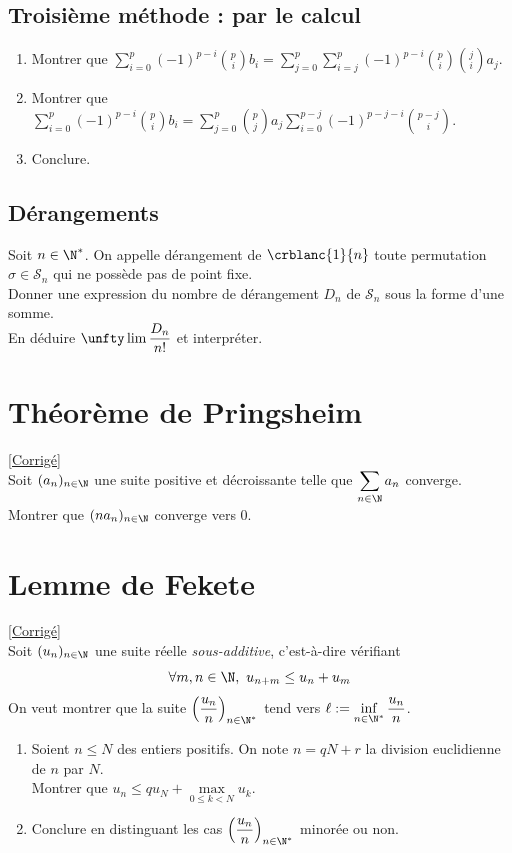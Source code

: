 \documentclass{book}
\begin{document}
	\subsection{Troisième méthode : par le calcul }
	\begin{enumerate}
		\item Montrer que $\displaystyle\sum_{i=0}^p(-1)^{p-i}\binom{p}{i}b_i=\sum_{j=0}^p\sum_{i=j}^p(-1)^{p-i}\binom{p}{i}\binom{j}{i}a_j$.
		\item Montrer que $\displaystyle\sum_{i=0}^p(-1)^{p-i}\binom{p}{i}b_i=\sum_{j=0}^p\binom{p}{j}a_j\sum_{i=0}^{p-j}(-1)^{p-j-i}\binom{p-j}{i}$.
		\item Conclure.
	\end{enumerate}
	
	\subsection{Dérangements }
	Soit $n\in \N^*$. On appelle dérangement de $\crblanc{1}{n}$ toute permutation $\sigma\in \mathcal S_n$ qui ne possède pas de point fixe.\\
	Donner une expression du nombre de dérangement $D_n$ de $\mathcal S_n$ sous la forme d'une somme.\\
	En déduire $\unfty\lim\displaystyle\frac{D_n}{n!}$ et interpréter.
	
	\section{Théorème de Pringsheim }
	\textcolor{blue}{\hyperref[sec:theoreme-de-pringsheim-etoile3]{[Corrigé]}}\\
	\label{Théorème de Pringsheim}
	Soit $(a_n)_{n\in \N}$ une suite positive et décroissante telle que $\displaystyle\sum\limits_{n\in \N} a_n$ converge. \\Montrer que $(na_n)_{n\in \N}$ converge vers 0.
	
	\section{Lemme de Fekete }
	\label{Lemme de Fekete}
	\textcolor{blue}{\hyperref[sec:lemme-de-fekete]{[Corrigé]}}\\
	Soit $(u_n)_{n\in \N}$ une suite réelle \textit{sous-additive}, c'est-à-dire vérifiant
	$$\forall m,n\in \N,\ u_{n+m}\leq u_n+u_m$$
	On veut montrer que la suite $\left(\dfrac{u_n}{n}\right)_{n\in \N^*}$ tend vers $\ell:=\inf\limits_{n\in \N^*}\dfrac{u_n}{n}$.
	\begin{enumerate}
		\item Soient $n\leq N$ des entiers positifs. On note $n=qN+r$ la division euclidienne de $n$ par $N$.\\
		Montrer que $u_n\leq qu_N+\max\limits_{0\leq k<N}u_k$.
		\item Conclure en distinguant les cas $\left(\dfrac{u_n}{n}\right)_{n\in \N^*}$ minorée ou non.
	\end{enumerate}
	
\end{document}
